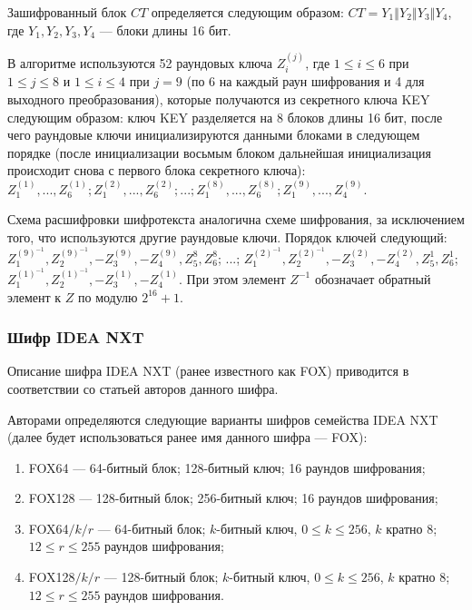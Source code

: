 \documentclass{./civarticle}
\begin{document}
Зашифрованный блок $CT$ определяется следующим образом: $CT = Y_1 \mathbin\Vert Y_2 \mathbin\Vert Y_3 \mathbin\Vert Y_4$, где $Y_1, Y_2, Y_3, Y_4$ --- блоки длины 16 бит.

В алгоритме используются 52 раундовых ключа $Z_i^{(j)}$, где $1 \leq i \leq 6$ при $1 \leq j \leq 8$ и $1 \leq i \leq 4$ при $j = 9$ (по 6 на каждый раун шифрования и 4 для выходного преобразования), которые получаются из секретного ключа KEY следующим образом: ключ KEY разделяется на 8 блоков длины 16 бит, после чего раундовые ключи инициализируются данными блоками в следующем порядке (после инициализации восьмым блоком дальнейшая инициализация происходит снова с первого блока секретного ключа): $Z_1^{(1)}, ..., Z_6^{(1)}; Z_1^{(2)}, ..., Z_6^{(2)}; ...; Z_1^{(8)}, ..., Z_6^{(8)}; Z_1^{(9)}, ..., Z_4^{(9)}$.

Схема расшифровки шифротекста аналогична схеме шифрования, за исключением того, что используются другие раундовые ключи. Порядок ключей следующий:
$Z_1^{(9)^{-1}}, Z_2^{(9)^{-1}}, -Z_3^{(9)}, -Z_4^{(9)}, Z_5^{8}, Z_6^{8}$; ...; $Z_1^{(2)^{-1}}, Z_2^{(2)^{-1}}, -Z_3^{(2)}, -Z_4^{(2)}, Z_5^{1}, Z_6^{1}$; $Z_1^{(1)^{-1}}, Z_2^{(1)^{-1}}, -Z_3^{(1)}, -Z_4^{(1)}$. При этом элемент $Z^{-1}$ обозначает обратный элемент к $Z$ по модулю $2^{16} + 1$.


\subsubsection{Шифр IDEA NXT}
Описание шифра IDEA NXT (ранее известного как FOX) приводится в соответствии со статьей \cite{fox} авторов данного шифра.

Авторами определяются следующие варианты шифров семейства IDEA NXT (далее будет использоваться ранее имя данного шифра --- FOX):

\begin{enumerate}
    \item FOX64 --- 64-битный блок; 128-битный ключ; 16 раундов шифрования;
    \item FOX128 --- 128-битный блок; 256-битный ключ; 16 раундов шифрования;
    \item FOX64$/k/r$ --- 64-битный блок; $k$-битный ключ, $0 \leq k \leq 256$, $k$ кратно 8; $12 \leq r \leq 255$ раундов шифрования;
    \item FOX128$/k/r$ --- 128-битный блок; $k$-битный ключ, $0 \leq k \leq 256$, $k$ кратно 8; $12 \leq r \leq 255$ раундов шифрования.
\end{enumerate}
\end{document}
